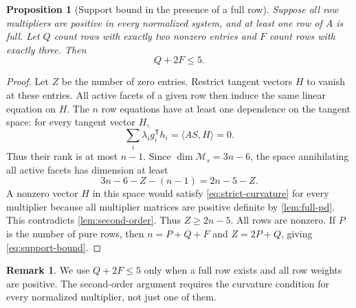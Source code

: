 \documentclass[11pt]{article}
\numberwithin{equation}{section}
\newtheorem{proposition}[proposition]{Proposition}
\theoremstyle{definition}
\theoremstyle{definition}
\newtheorem{remark}[remark]{Remark}
\begin{document}
\begin{proposition}[Support bound in the presence of a full row]
\label{prop:support-bound}
Suppose all row multipliers are positive in every normalized system,
and at least one row of $A$ is full. Let $Q$ count rows with exactly two
nonzero entries and $F$ count rows with exactly three. Then
\begin{equation}\label{eq:support-bound}
 Q+2F\le5.
\end{equation}
\end{proposition}
\begin{proof}
Let $Z$ be the number of zero entries. Restrict tangent vectors $H$ to
vanish at these entries. All active facets of a given row then induce
the same linear equation on $H$. The $n$ row equations have at least
one dependence on the tangent space: for every tangent vector $H$,
\[
 \sum_i\lambda_i g_i^{\mathsf T}h_i
 =\langle AS,H\rangle=0.
\]
Thus their rank is at most $n-1$.  Since
$\dim\mathcal M_s=3n-6$, the space annihilating all active facets
has dimension at least
\[
 3n-6-Z-(n-1)=2n-5-Z.
\]
A nonzero vector $H$ in this space would satisfy
\eqref{eq:strict-curvature} for every multiplier because
all multiplier matrices are positive definite by
\cref{lem:full-pd}. This contradicts \cref{lem:second-order}.
Thus $Z\ge2n-5$. All rows are nonzero. If $P$ is the number of pure
rows, then $n=P+Q+F$ and $Z=2P+Q$, giving \eqref{eq:support-bound}.
\end{proof}

\begin{remark}
We use $Q+2F\le5$ only when a full row exists and all row weights
are positive.  The second-order argument requires the curvature
condition for every normalized multiplier, not just one of them.
\end{remark}

\end{document}
